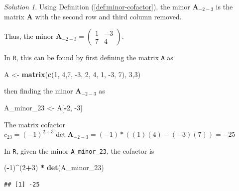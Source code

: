\documentclass[
]{book}
\newenvironment{Shaded}{\begin{snugshade}}{\end{snugshade}}
\newcommand{\DecValTok}[1]{\textcolor[rgb]{0.00,0.00,0.81}{#1}}
\newcommand{\KeywordTok}[1]{\textcolor[rgb]{0.13,0.29,0.53}{\textbf{#1}}}
\newcommand{\NormalTok}[1]{#1}
\newcommand{\OperatorTok}[1]{\textcolor[rgb]{0.81,0.36,0.00}{\textbf{#1}}}
\newcommand{\StringTok}[1]{\textcolor[rgb]{0.31,0.60,0.02}{#1}}
\theoremstyle{definition}
\theoremstyle{definition}
\theoremstyle{definition}
\theoremstyle{remark}
\newtheorem*{solution}{Solution}
\begin{document}
\begin{solution}

Using Definition (\ref{def:minor-cofactor}), the minor \(\mathbf{A}_{-2-3}\) is the matrix \(\mathbf{A}\) with the second row and third column removed.

Thus, the minor \(\mathbf{A}_{-2-3} = \begin{pmatrix} 1 & -3 \\ 7 & 4 \end{pmatrix}\).

In \texttt{R}, this can be found by first defining the matrix \texttt{A} as

\begin{Shaded}
\begin{Highlighting}[]
\NormalTok{A <-}\StringTok{ }\KeywordTok{matrix}\NormalTok{(}\KeywordTok{c}\NormalTok{(}\DecValTok{1}\NormalTok{, }\DecValTok{4}\NormalTok{,}\DecValTok{7}\NormalTok{, }\DecValTok{-3}\NormalTok{, }\DecValTok{2}\NormalTok{, }\DecValTok{4}\NormalTok{, }\DecValTok{1}\NormalTok{, }\DecValTok{-3}\NormalTok{, }\DecValTok{7}\NormalTok{), }\DecValTok{3}\NormalTok{,}\DecValTok{3}\NormalTok{)}
\end{Highlighting}
\end{Shaded}

then finding the minor \(\mathbf{A}_{-2-3}\) as

\begin{Shaded}
\begin{Highlighting}[]
\NormalTok{A_minor_}\DecValTok{23}\NormalTok{ <-}\StringTok{ }\NormalTok{A[}\OperatorTok{-}\DecValTok{2}\NormalTok{, }\DecValTok{-3}\NormalTok{]}
\end{Highlighting}
\end{Shaded}

The matrix cofactor \(c_{23} = (-1)^{2+3} \det \mathbf{A}_{-2-3} = (-1) * ((1)(4) - (-3) (7)) = -25\)

In \texttt{R}, given the minor \texttt{A\_minor\_23}, the cofactor is

\begin{Shaded}
\begin{Highlighting}[]
\NormalTok{(}\OperatorTok{-}\DecValTok{1}\NormalTok{)}\OperatorTok{^}\NormalTok{(}\DecValTok{2}\OperatorTok{+}\DecValTok{3}\NormalTok{) }\OperatorTok{*}\StringTok{ }\KeywordTok{det}\NormalTok{(A_minor_}\DecValTok{23}\NormalTok{)}
\end{Highlighting}
\end{Shaded}

\begin{verbatim}
## [1] -25
\end{verbatim}

\end{solution}
\end{document}
